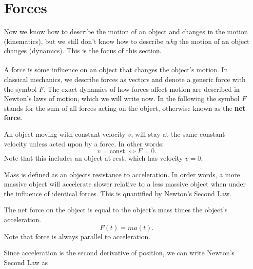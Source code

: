 \documentclass[../newtonian_mechanics.tex]{subfiles}
\begin{document}
    \section{Forces}
        \paragraph{}
        Now we know how to describe the motion of an object and changes in the motion (kinematics), but we still don't know how to describe \textit{why} the motion of an object changes (dynamics). This is the focus of this section.

        \paragraph{}
        A force is some influence on an object that changes the object's motion. In classical mechanics, we describe forces as vectors and denote a generic force with the symbol $F$. The exact dynamics of how forces affect motion are described in Newton's laws of motion, which we will write now. In the following the symbol $F$ stands for the sum of all forces acting on the object, otherwise known as the \textbf{net force}.
        \begin{definition}
            An object moving with constant velocity $v$, will stay at the same constant velocity unless acted upon by a force. In other words:
            \begin{equation}
                v=\text{const.}\iff F=0.
            \end{equation}
            Note that this includes an object at rest, which has velocity $v=0$.
        \end{definition}
        Mass is defined as an objects resistance to acceleration. In order words, a more massive object will accelerate slower relative to a less massive object when under the influence of identical forces. This is quantified by Newton's Second Law.
        \begin{definition}
            The net force on the object is equal to the object's mass times the object's acceleration.
            \begin{equation}
                F(t)=ma(t).
            \end{equation}
            Note that force is always parallel to acceleration.
        \end{definition}
        Since acceleration is the second derivative of position, we can write Newton's Second Law as
\end{document}
